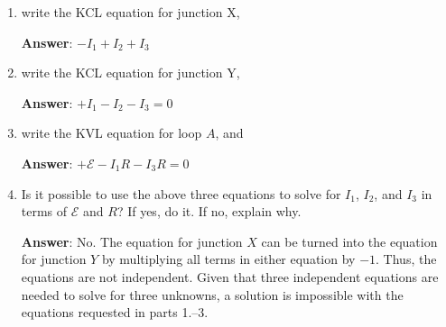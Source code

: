 \documentclass{article}
\begin{document}
\begin{enumerate}

  \item write the KCL equation for junction X,

        \ifsolutions
        \textbf{Answer}: $-I_1+I_2+I_3$
        \else
        \vskip 36pt
        \fi

  \item write the KCL equation for junction Y,

        \ifsolutions
        \textbf{Answer}: $+I_1-I_2-I_3=0$
        \else
        \vskip 36pt
        \fi

  \item write the KVL equation for loop $A$, and

        \ifsolutions
        \textbf{Answer}: $+\mathcal{E}-I_1R-I_3R=0$
        \else
        \vskip 36pt
        \fi

  \item Is it possible to use the above three equations to solve for $I_1$, $I_2$, and $I_3$ in terms of $\mathcal{E}$ and $R$? If yes, do it. If no, explain why.

        \ifsolutions
        \textbf{Answer}: No. The equation for junction $X$ can be turned into the equation for junction $Y$ by multiplying all terms in either equation by $-1$. Thus, the equations are not independent. Given that three independent equations are needed to solve for three unknowns, a solution is impossible with the equations requested in parts 1.--3.
        \fi

\end{enumerate}
\end{document}
